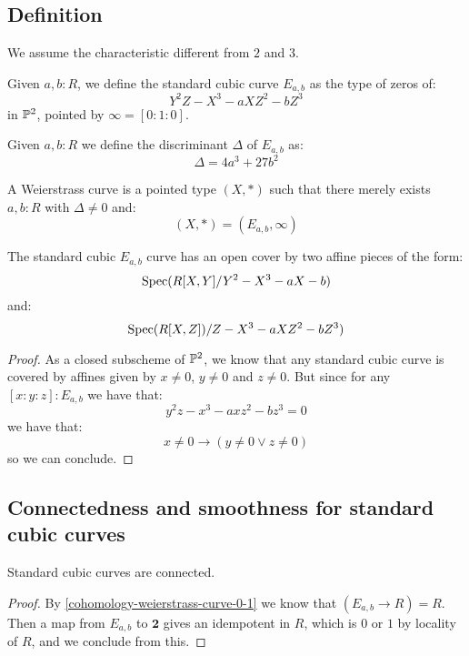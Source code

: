 \subsection{Definition}

We assume the characteristic different from $2$ and $3$.

\begin{definition}
Given $a,b:R$, we define the standard cubic curve $E_{a,b}$ as the type of zeros of:
\[Y^2Z - X^3 - a XZ^2 - b Z^3\]
in $\mathbb{P}^2$, pointed by $\infty = [0:1:0]$.
\end{definition}

\begin{definition}
Given $a,b:R$ we define the discriminant $\Delta$ of $E_{a,b}$ as:
\[\Delta = 4a^3 + 27 b^2\]
\end{definition}

\begin{definition}
A Weierstrass curve is a pointed type $(X,*)$ such that there merely exists $a,b:R$ with $\Delta\not=0$ and:
\[(X,*) = (E_{a,b},\infty)\]
\end{definition}

\begin{lemma}\label{standard-cover-cubic}
The standard cubic $E_{a,b}$ curve has an open cover by two affine pieces of the form:
\[\operatorname{Spec}(R[X,Y]/Y^2-X^3-aX-b)\]
and:
\[\operatorname{Spec}(R[X,Z])/Z-X^3-aXZ^2-bZ^3)\]
\end{lemma}

\begin{proof}
As a closed subscheme of $\mathbb{P}^2$, we know that any standard cubic curve is covered by affines given by $x\not=0$, $y\not=0$ and $z\not=0$. But since for any $[x:y:z]:E_{a,b}$ we have that:
\[y^2z - x^3 - a xz^2 - b z^3 = 0\]
we have that:
\[x\not=0 \to (y\not=0 \lor z\not=0)\]
so we can conclude.
\end{proof}

\subsection{Connectedness and smoothness for standard cubic curves}

\begin{lemma}
Standard cubic curves are connected.
\end{lemma}

\begin{proof}
By \cref{cohomology-weierstrass-curve-0-1} we know that $(E_{a,b}\to R) = R$. Then a map from $E_{a,b}$ to $\mathbf{2}$ gives an idempotent in $R$, which is $0$ or $1$ by locality of $R$, and we conclude from this.
\end{proof}

